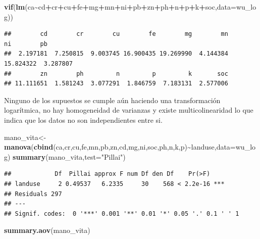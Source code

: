 \documentclass[
]{article}
\newenvironment{Shaded}{\begin{snugshade}}{\end{snugshade}}
\newcommand{\AttributeTok}[1]{\textcolor[rgb]{0.13,0.29,0.53}{#1}}
\newcommand{\FunctionTok}[1]{\textcolor[rgb]{0.13,0.29,0.53}{\textbf{#1}}}
\newcommand{\NormalTok}[1]{#1}
\newcommand{\OtherTok}[1]{\textcolor[rgb]{0.56,0.35,0.01}{#1}}
\newcommand{\SpecialCharTok}[1]{\textcolor[rgb]{0.81,0.36,0.00}{\textbf{#1}}}
\newcommand{\StringTok}[1]{\textcolor[rgb]{0.31,0.60,0.02}{#1}}
\begin{document}
\begin{Shaded}
\begin{Highlighting}[]
\FunctionTok{vif}\NormalTok{(}\FunctionTok{lm}\NormalTok{(ca}\SpecialCharTok{\textasciitilde{}}\NormalTok{cd}\SpecialCharTok{+}\NormalTok{cr}\SpecialCharTok{+}\NormalTok{cu}\SpecialCharTok{+}\NormalTok{fe}\SpecialCharTok{+}\NormalTok{mg}\SpecialCharTok{+}\NormalTok{mn}\SpecialCharTok{+}\NormalTok{ni}\SpecialCharTok{+}\NormalTok{pb}\SpecialCharTok{+}\NormalTok{zn}\SpecialCharTok{+}\NormalTok{ph}\SpecialCharTok{+}\NormalTok{n}\SpecialCharTok{+}\NormalTok{p}\SpecialCharTok{+}\NormalTok{k}\SpecialCharTok{+}\NormalTok{soc,}\AttributeTok{data=}\NormalTok{wu\_log))}
\end{Highlighting}
\end{Shaded}

\begin{verbatim}
##        cd        cr        cu        fe        mg        mn        ni        pb 
##  2.197181  7.250815  9.003745 16.900435 19.269990  4.144384 15.824322  3.287807 
##        zn        ph         n         p         k       soc 
## 11.111651  1.581243  3.077291  1.846759  7.183131  2.577006
\end{verbatim}

Ninguno de los supuestos se cumple aún haciendo una transformación
logarítmica, no hay homogeneidad de varianzas y existe multicolinearidad
lo que indica que los datos no son independientes entre si.

\begin{Shaded}
\begin{Highlighting}[]
\NormalTok{mano\_vita}\OtherTok{\textless{}{-}}\FunctionTok{manova}\NormalTok{(}\FunctionTok{cbind}\NormalTok{(ca,cr,cu,fe,mn,pb,zn,cd,mg,ni,soc,ph,n,k,p)}\SpecialCharTok{\textasciitilde{}}\NormalTok{landuse,}\AttributeTok{data=}\NormalTok{wu\_log)}
\FunctionTok{summary}\NormalTok{(mano\_vita,}\AttributeTok{test=}\StringTok{"Pillai"}\NormalTok{)}
\end{Highlighting}
\end{Shaded}

\begin{verbatim}
##            Df  Pillai approx F num Df den Df    Pr(>F)    
## landuse     2 0.49537   6.2335     30    568 < 2.2e-16 ***
## Residuals 297                                             
## ---
## Signif. codes:  0 '***' 0.001 '**' 0.01 '*' 0.05 '.' 0.1 ' ' 1
\end{verbatim}

\begin{Shaded}
\begin{Highlighting}[]
\FunctionTok{summary.aov}\NormalTok{(mano\_vita)}
\end{Highlighting}
\end{Shaded}
\end{document}
